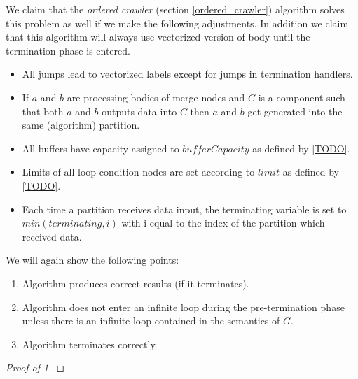 %
%
%
%
%


\begin{claim}
We claim that the \emph{ordered crawler} (section \ref{ordered_crawler}) algorithm solves this problem as well if we make the following adjustments. In addition we claim that this algorithm will always use vectorized version of body until the termination phase is entered.
 \begin{itemize}
   \item All jumps lead to vectorized labels except for jumps in termination handlers.
   \item If $a$ and $b$ are processing bodies of merge nodes and $C$ is a component such that both $a$ and $b$ outputs data into $C$ then $a$ and $b$ get generated into the same (algorithm) partition.
   \item All buffers have capacity assigned to $bufferCapacity$ as defined by \ref{TODO}.
   \item Limits of all loop condition nodes are set according to $limit$ as defined by \ref{TODO}.
   \item Each time a partition receives data input, the terminating variable is set to $min(terminating,i)$ with i equal to the index of the partition which received data.
 \end{itemize}
We will again show the following points:
\begin{enumerate}
  \item Algorithm produces correct results (if it terminates).
  \item Algorithm does not enter an infinite loop during the pre-termination phase unless there is an infinite loop contained in the semantics of $G$.
  \item Algorithm terminates correctly.
\end{enumerate}
\begin{proof}[Proof of 1]

\end{proof}
\end{claim}
